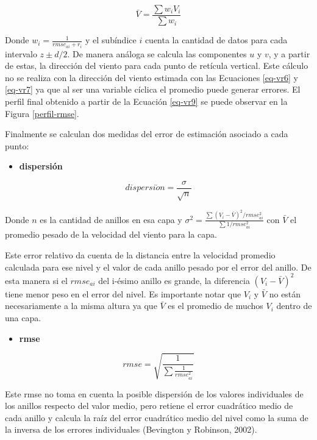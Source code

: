 \documentclass[12pt,spanish,oneside, a4paper]{book}
\providecommand{\tightlist}{%
  \setlength{\itemsep}{0pt}\setlength{\parskip}{0pt}}
\begin{document}
\begin{equation}\label{eq-vr9}
\bar{V} = \frac {\sum w_i V_i} {\sum w_i}
\end{equation}

Donde \(w_i = \frac {1}{rmse_{ai} + r_i}\) y el subíndice \(i\) cuenta
la cantidad de datos para cada intervalo \(z \pm d/2\). De manera
análoga se calcula las componentes \(u\) y \(v\), y a partir de estas,
la dirección del viento para cada punto de retícula vertical. Este
cálculo no se realiza con la dirección del viento estimada con las
Ecuaciones \ref{eq-vr6} y \ref{eq-vr7} ya que al ser una variable
cíclica el promedio puede generar errores. El perfil final obtenido a
partir de la Ecuación \ref{eq-vr9} se puede observar en la Figura
\ref{perfil-rmse}.

Finalmente se calculan dos medidas del error de estimación asociado a
cada punto:

\begin{itemize}
\tightlist
\item
  \textbf{dispersión}
\end{itemize}

\begin{equation}\label{eq-vr10} 
dispersi\acute{o}n = \frac{\sigma}{\sqrt{n}}
\end{equation}

Donde \(n\) es la cantidad de anillos en esa capa y
\(\sigma^{2}= \frac{\sum (V_i - \bar{V})^2 /rmse_{ai}^2}{\sum 1/rmse_{ai}^2}\)
con \(\bar{V}\) el promedio pesado de la velocidad del viento para la
capa.

Este error relativo da cuenta de la distancia entre la velocidad
promedio calculada para ese nivel y el valor de cada anillo pesado por
el error del anillo. De esta manera si el \(rmse_{ai}\) del i-ésimo
anillo es grande, la diferencia \((V_i - \bar{V})^2\) tiene menor peso
en el error del nivel. Es importante notar que \(V_i\) y \(\bar{V}\) no
están necesariamente a la misma altura ya que \(\bar{V}\) es el promedio
de muchos \(V_i\) dentro de una capa.

\begin{itemize}
\tightlist
\item
  \textbf{rmse}
\end{itemize}

\begin{equation}\label{eq-vr11}
rmse = \sqrt{\frac{1}{\sum \frac{1}{rmse_{ai}^2}}}
\end{equation}

Este rmse no toma en cuenta la posible dispersión de los valores
individuales de los anillos respecto del valor medio, pero retiene el
error cuadrático medio de cada anillo y calcula la raíz del error
cuadrático medio del nivel como la suma de la inversa de los errores
individuales (Bevington y Robinson, 2002).
\end{document}
